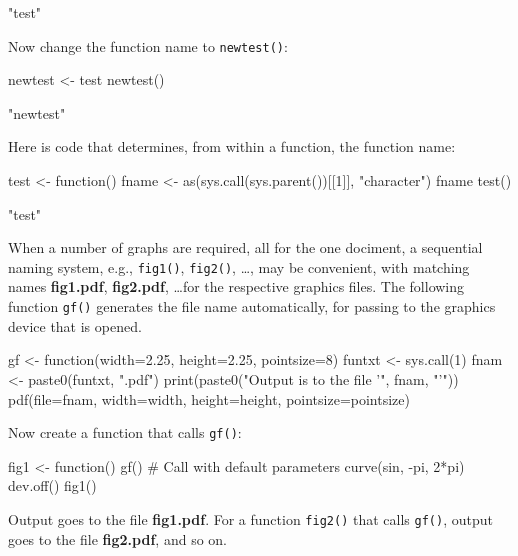 \documentclass{tufte-book}\usepackage[]{graphicx}\usepackage[]{color}
\newcommand{\txtt}[1]{\texttt{#1}}
\newcommand{\margtt}[1]{{\footnotesize \texttt{#1}}}
\begin{document}
\begin{Schunk}
\begin{Soutput}
[1] "test"
\end{Soutput}
\end{Schunk}

\begin{marginfigure}
Now change the function name to \margtt{newtest()}:
\begin{Schunk}
\begin{Sinput}
newtest <- test
newtest()
\end{Sinput}
\begin{Soutput}
[1] "newtest"
\end{Soutput}
\end{Schunk}
\end{marginfigure}
Here is code that determines, from within a function,
the function name:
\begin{Schunk}
\begin{Sinput}
test <- function(){
 fname <- as(sys.call(sys.parent())[[1]],
             "character")
  fname
}
test()
\end{Sinput}
\begin{Soutput}
[1] "test"
\end{Soutput}
\end{Schunk}

When a number of graphs are required, all for the one dociment, a
sequential naming system, e.g., \txtt{fig1()}, \txtt{fig2()}, \ldots,
may be convenient, with matching names \textbf{fig1.pdf},
\textbf{fig2.pdf}, \ldots for the respective graphics files.  The
following function \txtt{gf()} generates the file name automatically,
for passing to the graphics device that is opened.
\begin{Schunk}
\begin{Sinput}
gf <-
    function(width=2.25, height=2.25, pointsize=8){
        funtxt <- sys.call(1)
        fnam <- paste0(funtxt, ".pdf")
        print(paste0("Output is to the file '",
                     fnam, "'"))
        pdf(file=fnam, width=width, height=height,
            pointsize=pointsize)
    }
\end{Sinput}
\end{Schunk}

Now create a function that calls \txtt{gf()}:
\begin{Schunk}
\begin{Sinput}
fig1 <- function(){
    gf()             # Call with default parameters
    curve(sin, -pi, 2*pi)
    dev.off()
}
fig1()
\end{Sinput}
\end{Schunk}
\noindent
Output goes to the file \textbf{fig1.pdf}.  For a function
\txtt{fig2()} that calls \txtt{gf()}, output goes to the file
\textbf{fig2.pdf}, and so on.
\end{document}
